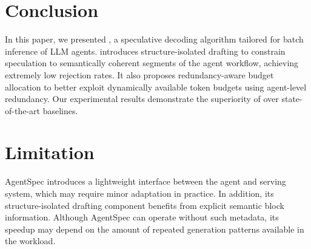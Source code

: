 \section{Conclusion}
\label{sec:conclusion}

In this paper, we presented \sysname, a speculative decoding algorithm tailored for batch inference of LLM agents.
%
\sysname introduces structure-isolated drafting to constrain speculation to semantically coherent segments of the agent workflow, achieving extremely low rejection rates. It also proposes redundancy-aware budget allocation to better exploit dynamically available token budgets using agent-level redundancy.
%
Our experimental results demonstrate the superiority of \sysname over state-of-the-art baselines.
%
%

\section*{Limitation} AgentSpec introduces a lightweight interface between the agent and serving system, which may require minor adaptation in practice. In addition, its structure-isolated drafting component benefits from explicit semantic block information. Although AgentSpec can operate without such metadata, its speedup may depend on the amount of repeated generation patterns available in the workload.

